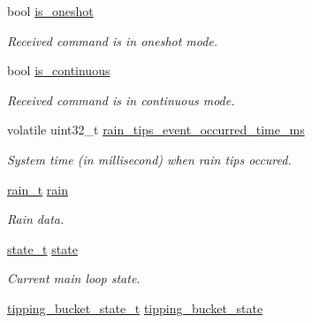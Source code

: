 \begin{DoxyCompactItemize}
\mbox{\label{i2c-rain_8h_a6090a983e62d9556906716dd85f78d9d}} 
bool \hyperlink{i2c-rain_8h_a6090a983e62d9556906716dd85f78d9d}{is\+\_\+oneshot}
\begin{DoxyCompactList}\small\item\em Received command is in oneshot mode. \end{DoxyCompactList}\item 
\mbox{\label{i2c-rain_8h_a75ef189b6b17aa09010c574ed6b01fc3}} 
bool \hyperlink{i2c-rain_8h_a75ef189b6b17aa09010c574ed6b01fc3}{is\+\_\+continuous}
\begin{DoxyCompactList}\small\item\em Received command is in continuous mode. \end{DoxyCompactList}\item 
\mbox{\label{i2c-rain_8h_aa0097a28d3e4da7c88e72228e9b236d2}} 
volatile uint32\+\_\+t \hyperlink{i2c-rain_8h_aa0097a28d3e4da7c88e72228e9b236d2}{rain\+\_\+tips\+\_\+event\+\_\+occurred\+\_\+time\+\_\+ms}
\begin{DoxyCompactList}\small\item\em System time (in millisecond) when rain tips occured. \end{DoxyCompactList}\item 
\mbox{\label{i2c-rain_8h_a5688d7d07e5d53ec6ccd7acce49a728c}} 
\hyperlink{structrain__t}{rain\+\_\+t} \hyperlink{i2c-rain_8h_a5688d7d07e5d53ec6ccd7acce49a728c}{rain}
\begin{DoxyCompactList}\small\item\em Rain data. \end{DoxyCompactList}\item 
\mbox{\label{i2c-rain_8h_adc6e5733fc3c22f0a7b2914188c49c90}} 
\hyperlink{i2c-rain_8h_aa0aafed44fec19806d8f9ad834be1248}{state\+\_\+t} \hyperlink{i2c-rain_8h_adc6e5733fc3c22f0a7b2914188c49c90}{state}
\begin{DoxyCompactList}\small\item\em Current main loop state. \end{DoxyCompactList}\item 
\mbox{\label{i2c-rain_8h_ad17df11ab3931697018251d1e0e49d4a}} 
\hyperlink{i2c-rain_8h_a7935f2f599e6a870190d4ae0a86205ba}{tipping\+\_\+bucket\+\_\+state\+\_\+t} \hyperlink{i2c-rain_8h_ad17df11ab3931697018251d1e0e49d4a}{tipping\+\_\+bucket\+\_\+state}

\end{DoxyCompactItemize}

